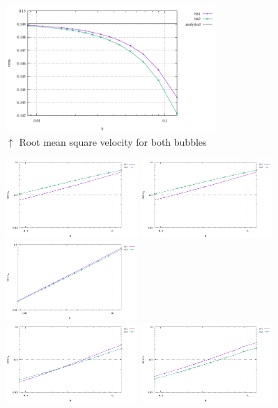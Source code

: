 \begin{center}
\includegraphics[width=8cm]{python_codes/fieldstone_75/results/mms3D/vrms.pdf}\\
{\captionfont $\uparrow$ Root mean square velocity for both bubbles}
\end{center}

\begin{center}
\includegraphics[width=5cm]{python_codes/fieldstone_75/results/mms3D/errors_exx}
\includegraphics[width=5cm]{python_codes/fieldstone_75/results/mms3D/errors_eyy}
\includegraphics[width=5cm]{python_codes/fieldstone_75/results/mms3D/errors_ezz}\\
\includegraphics[width=5cm]{python_codes/fieldstone_75/results/mms3D/errors_exy}
\includegraphics[width=5cm]{python_codes/fieldstone_75/results/mms3D/errors_exz}

\end{center}
